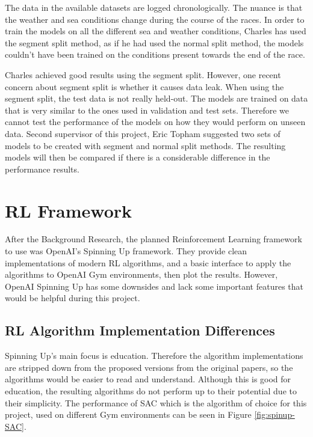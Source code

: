 The data in the available datasets are logged chronologically. The nuance is that the weather and sea conditions change during the course of the races. In order to train the models on all the different sea and weather conditions, Charles has used the segment split method, as if he had used the normal split method, the models couldn't have been trained on the conditions present towards the end of the race.

Charles achieved good results using the segment split. However, one recent concern about segment split is whether it causes data leak. When using the segment split, the test data is not really held-out. The models are trained on data that is very similar to the ones used in validation and test sets. Therefore we cannot test the performance of the models on how they would perform on unseen data. Second supervisor of this project, Eric Topham suggested two sets of models to be created with segment and normal split methods. The resulting models will then be compared if there is a considerable difference in the performance results.

\section{RL Framework}
After the Background Research, the planned Reinforcement Learning framework to use was OpenAI's Spinning Up framework. They provide clean implementations of modern RL algorithms, and a basic interface to apply the algorithms to OpenAI Gym environments, then plot the results. However, OpenAI Spinning Up has some downsides and lack some important features that would be helpful during this project.

\subsection{RL Algorithm Implementation Differences} \label{RLF:imp-diff}
Spinning Up's main focus is education. Therefore the algorithm implementations are stripped down from the proposed versions from the original papers, so the algorithms would be easier to read and understand. Although this is good for education, the resulting algorithms do not perform up to their potential due to their simplicity. The performance of SAC which is the algorithm of choice for this project, used on different Gym environments can be seen in Figure \ref{fig:spinup-SAC}.

